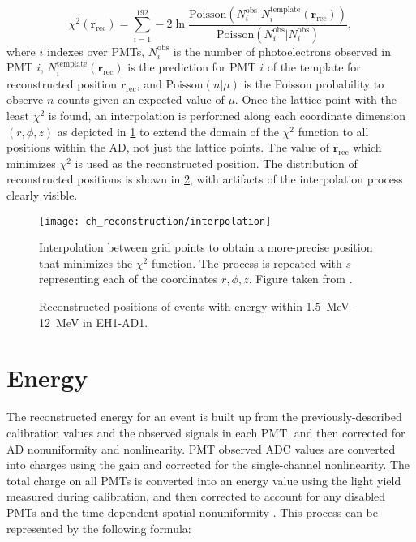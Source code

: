 \begin{equation}
    \chi^2(\textbf{r}_{\text{rec}}) = \sum_{i=1}^{192} -2\ln\frac{
        \text{Poisson}(N_i^{\text{obs}} \vert N_i^{\text{template}}(\textbf{r}_{\text{rec}}))
    }
    {
        \text{Poisson}(N_i^{\text{obs}} \vert N_i^{\text{obs}})
    },
\end{equation}
where $i$ indexes over PMTs,
$N_i^{\text{obs}}$ is the number of photoelectrons observed in PMT $i$,
$N_{i}^{\text{template}}(\textbf{r}_{\text{rec}})$ is the prediction
for PMT $i$ of the template for reconstructed position $\textbf{r}_{\text{rec}}$,
and $\text{Poisson}(n\vert\mu)$ is the Poisson probability
to observe $n$ counts given an expected value of $\mu$.
Once the lattice point with the least $\chi^2$ is found,
an interpolation is performed along each coordinate dimension $(r, \phi, z)$
as depicted in \cref{fig:interpolation}
to extend the domain of the $\chi^2$ function to all positions within the AD,
not just the lattice points.
The value of $\textbf{r}_{\text{rec}}$ which minimizes $\chi^2$
is used as the reconstructed position.
The distribution of reconstructed positions is shown in \cref{fig:position_map},
with artifacts of the interpolation process clearly visible.

\begin{figure}
    \centering
    \texttt{[image: ch\_reconstruction/interpolation]}
    \caption{
        Interpolation between grid points to obtain a more-precise position
        that minimizes the $\chi^2$ function.
        The process is repeated with $s$ representing each of the coordinates
        $r, \phi, z$.
        Figure taken from \cite{adsimple1}.
    }
    \label{fig:interpolation}
\end{figure}

\begin{figure}
    \caption{
        Reconstructed positions of events with energy within \SIrange{1.5}{12}{\MeV}
        in EH1-AD1.
    }
    \label{fig:position_map}
\end{figure}

\section{Energy}
\label{sec:reco_energy}

The reconstructed energy for an event is built up from the previously-described
calibration values and the observed signals in each PMT,
and then corrected for AD nonuniformity and nonlinearity.
PMT observed ADC values are converted into charges using the gain
and corrected for the single-channel nonlinearity.
The total charge on all PMTs is converted into an energy value
using the light yield measured during calibration,
and then corrected to account for any disabled PMTs
and the time-dependent spatial nonuniformity \cite{ngd2016}.
This process can be represented by the following formula:

